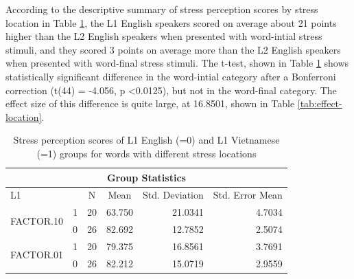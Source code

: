 \documentclass[a4paper]{article}
\begin{document}
According to the descriptive summary of stress perception scores by stress location in Table \ref{tab:location}, the L1 English speakers scored on average about 21 points higher than the L2 English speakers when presented with word-intial stress stimuli, and they scored 3 points on average more than the L2 English speakers when presented with word-final stress stimuli. The t-test, shown in Table \ref{tab:location} shows statistically significant difference in the word-intial category after a Bonferroni correction (t(44) = -4.056, p \textless 0.0125), but not in the word-final category. The effect size of this difference is quite large, at 16.8501, shown in Table \ref{tab:effect-location}.

\begin{table}[H]
\centering
\caption{Stress perception scores of L1 English (=0) and L1 Vietnamese (=1) groups for words with different stress locations}
\label{tab:location}
\begin{tabular}{|l|l|r|r|r|r|} 
\hline
\multicolumn{6}{|c|}{Group Statistics}                                                                                                                            \\ 
\hline
L1                         &   & \multicolumn{1}{c|}{N} & \multicolumn{1}{c|}{Mean} & \multicolumn{1}{c|}{Std. Deviation} & \multicolumn{1}{c|}{Std. Error Mean}  \\ 
\hline
\multirow{2}{*}{FACTOR.10} & 1 & 20                     & 63.750                    & 21.0341                             & 4.7034                                \\ 
\cline{2-6}
                           & 0 & 26                     & 82.692                    & 12.7852                             & 2.5074                                \\ 
\hline
\multirow{2}{*}{FACTOR.01} & 1 & 20                     & 79.375                    & 16.8561                             & 3.7691                                \\ 
\cline{2-6}
                           & 0 & 26                     & 82.212                    & 15.0719                             & 2.9559                                \\
\hline
\end{tabular}

\end{table}
\end{document}
